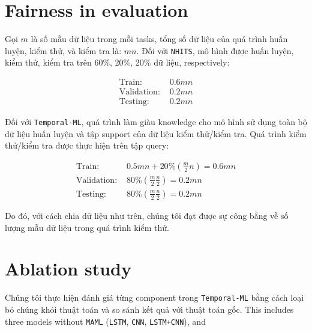 \section{Fairness in evaluation}

Gọi $m$ là số mẫu dữ liệu trong mỗi tasks, tổng số dữ liệu của quá trình huấn luyện, kiểm thử, và kiểm tra là: $mn$. Đối với \verb|NHITS|, mô hình được huấn luyện, kiểm thử, kiểm tra trên 60\%, 20\%, 20\% dữ liệu, respectively:

\begin{align*}
    \text{Train: } &0.6mn\\
    \text{Validation: } &0.2mn\\
    \text{Testing: } &0.2mn
\end{align*}

Đối với \verb|Temporal-ML|, quá trình làm giàu knowledge cho mô hình sử dụng toàn bộ dữ liệu huấn luyện và tập support của dữ liệu kiểm thử/kiểm tra. Quá trình kiểm thử/kiểm tra được thực hiện trên tập query:

\begin{align*}
    \text{Train: } &0.5mn + 20\%\left( \frac{m}{2}n \right) = 0.6mn\\
    \text{Validation: } &80\% \left( \frac{m}{2}\frac{n}{2} \right)  =0.2mn\\
    \text{Testing: } &80\% \left( \frac{m}{2}\frac{n}{2} \right) =0.2mn
\end{align*}

Do đó, với cách chia dữ liệu như trên, chúng tôi đạt được sự công bằng về số lượng mẫu dữ liệu trong quá trình kiểm thử.

\section{Ablation study}


Chúng tôi thực hiện đánh giá từng component trong \verb|Temporal-ML| bằng cách loại bỏ chúng khỏi thuật toán và so sánh kết quả với thuật toán gốc. This includes three models without \verb|MAML| (\verb|LSTM|, \verb|CNN|, \verb|LSTM+CNN|), and 
